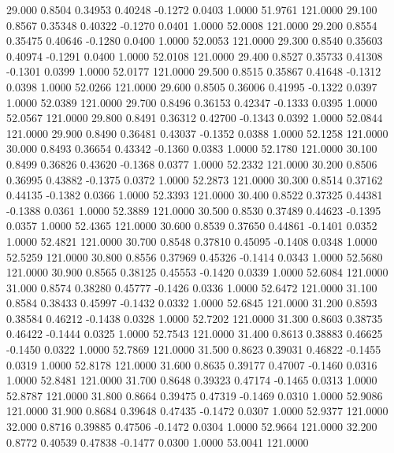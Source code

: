   29.000   0.8504   0.34953   0.40248  -0.1272   0.0403   1.0000  51.9761 121.0000
  29.100   0.8567   0.35348   0.40322  -0.1270   0.0401   1.0000  52.0008 121.0000
  29.200   0.8554   0.35475   0.40646  -0.1280   0.0400   1.0000  52.0053 121.0000
  29.300   0.8540   0.35603   0.40974  -0.1291   0.0400   1.0000  52.0108 121.0000
  29.400   0.8527   0.35733   0.41308  -0.1301   0.0399   1.0000  52.0177 121.0000
  29.500   0.8515   0.35867   0.41648  -0.1312   0.0398   1.0000  52.0266 121.0000
  29.600   0.8505   0.36006   0.41995  -0.1322   0.0397   1.0000  52.0389 121.0000
  29.700   0.8496   0.36153   0.42347  -0.1333   0.0395   1.0000  52.0567 121.0000
  29.800   0.8491   0.36312   0.42700  -0.1343   0.0392   1.0000  52.0844 121.0000
  29.900   0.8490   0.36481   0.43037  -0.1352   0.0388   1.0000  52.1258 121.0000
  30.000   0.8493   0.36654   0.43342  -0.1360   0.0383   1.0000  52.1780 121.0000
  30.100   0.8499   0.36826   0.43620  -0.1368   0.0377   1.0000  52.2332 121.0000
  30.200   0.8506   0.36995   0.43882  -0.1375   0.0372   1.0000  52.2873 121.0000
  30.300   0.8514   0.37162   0.44135  -0.1382   0.0366   1.0000  52.3393 121.0000
  30.400   0.8522   0.37325   0.44381  -0.1388   0.0361   1.0000  52.3889 121.0000
  30.500   0.8530   0.37489   0.44623  -0.1395   0.0357   1.0000  52.4365 121.0000
  30.600   0.8539   0.37650   0.44861  -0.1401   0.0352   1.0000  52.4821 121.0000
  30.700   0.8548   0.37810   0.45095  -0.1408   0.0348   1.0000  52.5259 121.0000
  30.800   0.8556   0.37969   0.45326  -0.1414   0.0343   1.0000  52.5680 121.0000
  30.900   0.8565   0.38125   0.45553  -0.1420   0.0339   1.0000  52.6084 121.0000
  31.000   0.8574   0.38280   0.45777  -0.1426   0.0336   1.0000  52.6472 121.0000
  31.100   0.8584   0.38433   0.45997  -0.1432   0.0332   1.0000  52.6845 121.0000
  31.200   0.8593   0.38584   0.46212  -0.1438   0.0328   1.0000  52.7202 121.0000
  31.300   0.8603   0.38735   0.46422  -0.1444   0.0325   1.0000  52.7543 121.0000
  31.400   0.8613   0.38883   0.46625  -0.1450   0.0322   1.0000  52.7869 121.0000
  31.500   0.8623   0.39031   0.46822  -0.1455   0.0319   1.0000  52.8178 121.0000
  31.600   0.8635   0.39177   0.47007  -0.1460   0.0316   1.0000  52.8481 121.0000
  31.700   0.8648   0.39323   0.47174  -0.1465   0.0313   1.0000  52.8787 121.0000
  31.800   0.8664   0.39475   0.47319  -0.1469   0.0310   1.0000  52.9086 121.0000
  31.900   0.8684   0.39648   0.47435  -0.1472   0.0307   1.0000  52.9377 121.0000
  32.000   0.8716   0.39885   0.47506  -0.1472   0.0304   1.0000  52.9664 121.0000
  32.200   0.8772   0.40539   0.47838  -0.1477   0.0300   1.0000  53.0041 121.0000
